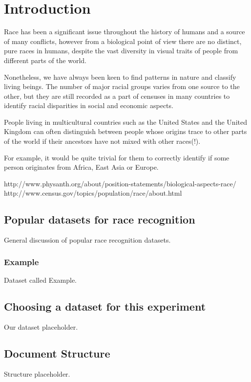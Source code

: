 \chapter{Introduction}
\label{introduction}
Race has been a significant issue throughout the history of humans 
and a source of many conflicts, however from a biological point of view
there are no distinct, pure races in humans, despite the vast diversity 
in visual traits of people from different parts of the world.

Nonetheless, we have always been keen to find patterns in nature and 
classify living beings. The number of major racial groups varies from 
one source to the other, but they are still recorded as a part of censuses 
in many countries to identify racial disparities in social and economic aspects.

People living in multicultural countries such as the United States and the 
United Kingdom can often distinguish between people whose origins trace to other
parts of the world if their ancestors have not mixed with other races(!).

For example, it would be quite trivial for them to correctly identify if some person
originates from Africa, East Asia or Europe.



http://www.physanth.org/about/position-statements/biological-aspects-race/
http://www.census.gov/topics/population/race/about.html



\section{Popular datasets for race recognition}
\label{introduction:datasets}
General discussion of popular race recognition datasets.
\subsection{Example}
\label{introduction:datasets:example}
Dataset called Example.

\section{Choosing a dataset for this experiment}
\label{introduction:ourdataset} 
Our dataset placeholder.

\section{Document Structure}
\label{introduction:structure} 
Structure placeholder.

